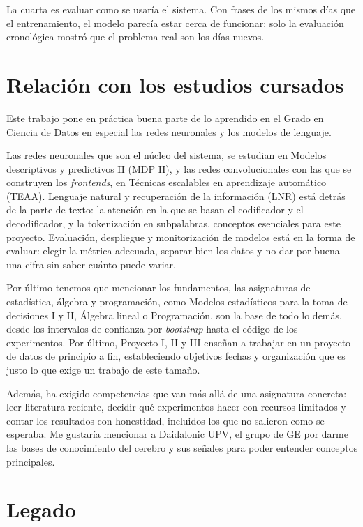 La cuarta es evaluar como se usaría el sistema. Con frases de los mismos días que el entrenamiento, el modelo parecía estar cerca de funcionar; solo la evaluación cronológica mostró que el problema real son los días nuevos.

\section{Relación con los estudios cursados}

Este trabajo pone en práctica buena parte de lo aprendido en el Grado en Ciencia de Datos en especial las redes neuronales y los modelos de lenguaje. 

Las redes neuronales que son el núcleo del sistema, se estudian en Modelos descriptivos y predictivos II (MDP II), y las redes convolucionales con las que se construyen los \textit{frontends}, en Técnicas escalables en aprendizaje automático (TEAA). Lenguaje natural y recuperación de la información (LNR) está detrás de la parte de texto: la atención en la que se basan el codificador y el decodificador, y la tokenización en subpalabras, conceptos esenciales para este proyecto. Evaluación, despliegue y monitorización de modelos está en la forma de evaluar: elegir la métrica adecuada, separar bien los datos y no dar por buena una cifra sin saber cuánto puede variar. 

Por último tenemos que mencionar los fundamentos, las asignaturas de estadística, álgebra y programación, como Modelos estadísticos para la toma de decisiones I y II, Álgebra lineal o Programación, son la base de todo lo demás, desde los intervalos de confianza por \textit{bootstrap} hasta el código de los experimentos. Por último, Proyecto I, II y III enseñan a trabajar en un proyecto de datos de principio a fin, estableciendo objetivos fechas y organización que es justo lo que exige un trabajo de este tamaño.

Además, ha exigido competencias que van más allá de una asignatura concreta: leer literatura reciente, decidir qué experimentos hacer con recursos limitados y contar los resultados con honestidad, incluidos los que no salieron como se esperaba. Me gustaría mencionar a Daidalonic UPV, el grupo de GE por darme las bases de conocimiento del cerebro y sus señales para poder entender conceptos principales.

\section{Legado}

